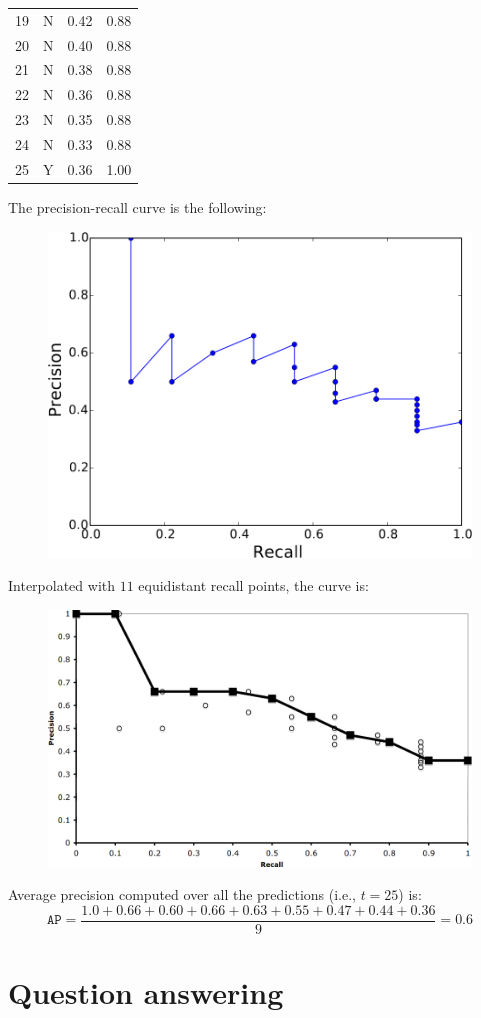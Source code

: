 \begin{example}
\begin{table}[H]
\begin{tabular}[t]{cccc}
            19 & N & 0.42 & 0.88 \\
            20 & N & 0.40 & 0.88 \\
            21 & N & 0.38 & 0.88 \\
            22 & N & 0.36 & 0.88 \\
            23 & N & 0.35 & 0.88 \\
            24 & N & 0.33 & 0.88 \\
            25 & Y & 0.36 & 1.00 \\
            \bottomrule
        \end{tabular}
    \end{table}

    The precision-recall curve is the following:
    \begin{figure}[H]
        \centering
        \includegraphics[width=0.4\linewidth]{./img/ir_pr_curve.png}
    \end{figure}
    Interpolated with $11$ equidistant recall points, the curve is:
    \begin{figure}[H]
        \centering
        \includegraphics[width=0.45\linewidth]{./img/ir_pr_interpolated.png}
    \end{figure}

    Average precision computed over all the predictions (i.e., $t=25$) is:
    \[ \texttt{AP} = \frac{1.0 + 0.66 + 0.60 + 0.66 + 0.63 + 0.55 + 0.47 + 0.44 + 0.36}{9} = 0.6 \]
\end{example}



\section{Question answering}


